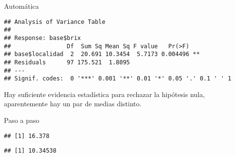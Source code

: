 \documentclass[
]{article}
\newenvironment{Shaded}{\begin{snugshade}}{\end{snugshade}}
\newcommand{\DecValTok}[1]{\textcolor[rgb]{0.00,0.00,0.81}{#1}}
\newcommand{\FunctionTok}[1]{\textcolor[rgb]{0.13,0.29,0.53}{\textbf{#1}}}
\newcommand{\NormalTok}[1]{#1}
\newcommand{\OtherTok}[1]{\textcolor[rgb]{0.56,0.35,0.01}{#1}}
\newcommand{\SpecialCharTok}[1]{\textcolor[rgb]{0.81,0.36,0.00}{\textbf{#1}}}
\begin{document}
Automática

\begin{Shaded}
\end{Shaded}

\begin{verbatim}
## Analysis of Variance Table
## 
## Response: base$brix
##                Df  Sum Sq Mean Sq F value   Pr(>F)   
## base$localidad  2  20.691 10.3454  5.7173 0.004496 **
## Residuals      97 175.521  1.8095                    
## ---
## Signif. codes:  0 '***' 0.001 '**' 0.01 '*' 0.05 '.' 0.1 ' ' 1
\end{verbatim}

Hay suficiente evidencia estadística para rechazar la hipótesis nula,
aparentemente hay un par de medias distinto.

Paso a paso

\begin{Shaded}
\end{Shaded}

\begin{verbatim}
## [1] 16.378
\end{verbatim}

\begin{Shaded}
\end{Shaded}

\begin{verbatim}
## [1] 10.34538
\end{verbatim}

\begin{Shaded}
\end{Shaded}
\end{document}
